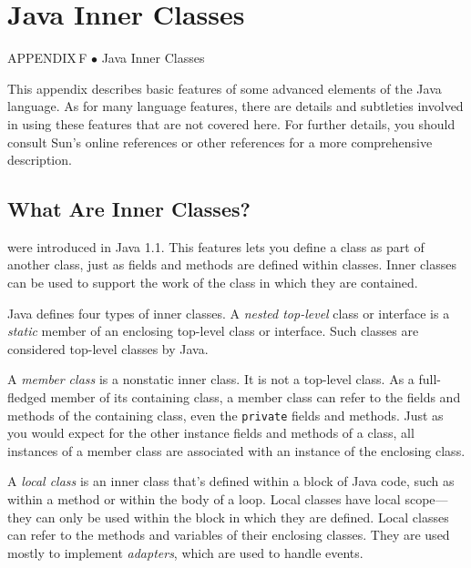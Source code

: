 \setcounter{table}{0}
\setcounter{figure}{0}
\renewcommand{\thetable}{\mbox{F.\arabic{table}}}%
\renewcommand{\thefigure}{\mbox{F--\arabic{figure}}}%

\chapter{Java Inner Classes}

{{\color{cyan}APPENDIX\,F\,\,$\bullet$\,\,}Java Inner Classes}

\noindent This appendix describes basic features of some advanced
elements of the Java language.  As for many language features, there
are details and subtleties involved in using these features that are
not covered here.  For further details, you should consult Sun's online
references or other references for a more comprehensive description.

\section*{What Are Inner Classes?}
\label{what-are-inner-classes}
 were introduced in Java 1.1. This features lets
you define a class as part of another class, just as fields and
methods are defined within classes.   Inner classes can be used to
support the work of the class in which they are contained.

Java defines four types of inner classes.   A {\it nested top-level}
class or interface is a {\it static} member of an enclosing top-level
class or interface.  Such classes are considered top-level classes
by Java.

A {\it member class} is a nonstatic inner class.  It is not a
top-level class.  As a full-fledged member of its containing class, a
member class can refer to the fields and methods of the containing
class, even the {\tt private} fields and methods.  Just as you would
expect for the other instance fields and methods of a class, all
instances of a member class are associated with an instance of the
enclosing class.

A {\it local class} is an inner class that's defined within a block of
Java code, such as within a method or within the body of a loop.  Local
classes have local scope---they can only be used within the block in
which they are defined.  Local classes can refer to the methods and
variables of their enclosing classes.   They are used mostly to implement
{\it adapters}, which are used to handle events.


